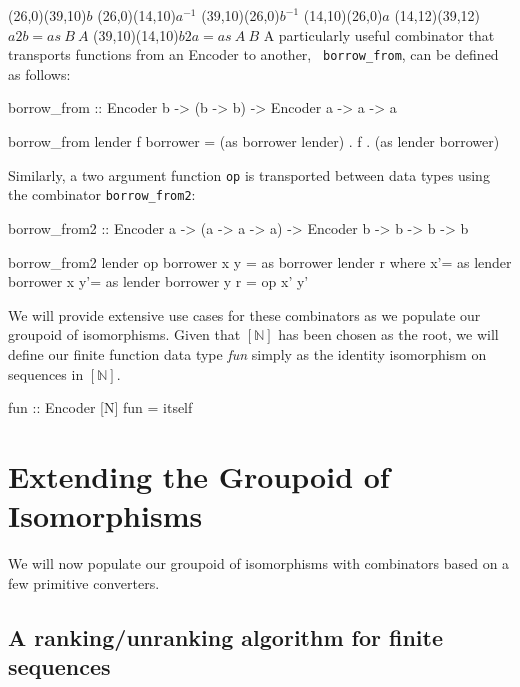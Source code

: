 \documentclass[]{INCLUDES/llncs}
\begin{document}
\mor(26,0)(39,10){$b$}
\mor(26,0)(14,10){$a^{-1}$}
\mor(39,10)(26,0){$b^{-1}$}
\mor(14,10)(26,0){$a$}
\mor(14,12)(39,12){$a2b=as~B~A$}
\mor(39,10)(14,10){$b2a=as~A~B$}
\enddc
\vskip 0.30cm
A particularly useful combinator that
transports functions from an Encoder to another, {\tt
borrow\_from}, can be defined as follows:
\begin{code}
borrow_from :: Encoder b -> (b -> b) ->
               Encoder a -> a -> a

borrow_from lender f borrower = 
  (as borrower lender) . f . (as lender borrower)
\end{code}
Similarly, a two argument function {\tt op} is transported between data types
using the combinator {\tt borrow\_from2}:
\begin{code}
borrow_from2 :: Encoder a -> (a -> a -> a) -> 
                Encoder b -> b -> b -> b

borrow_from2 lender op borrower x y = 
    as borrower lender r where
       x'= as lender borrower x
       y'= as lender borrower y
       r = op x' y'
\end{code}
We will provide extensive use cases for these combinators
as we populate our groupoid of isomorphisms.
\noindent Given that $[\mathbb{N}]$ has been chosen as the root, we will define our
finite function data type {\em fun} simply as the identity isomorphism 
on sequences in $[\mathbb{N}]$.
\begin{code}  
fun :: Encoder [N]
fun = itself
\end{code}

\section{Extending the Groupoid of Isomorphisms}
We will now populate our groupoid of isomorphisms with
combinators based on a few primitive converters.

\subsection{A ranking/unranking algorithm for finite sequences}
\end{document}
